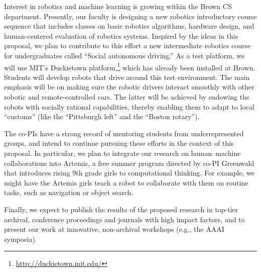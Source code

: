 Interest in robotics and machine learning is growing within the Brown
CS department.  Presently, our faculty is designing a new robotics
introductory course sequence that includes classes on basic robotics
algorithms, hardware design, and human-centered evaluation of robotics
systems.  Inspired by the ideas in this proposal, we plan to
contribute to this effort a new intermediate robotics course for
undergraduates called ``Social autonomous driving.''  As a test
platform, we will use MIT's Duckietown
platform,\footnote{\url{http://duckietown.mit.edu/}} which has already
been installed at Brown.  Students will develop robots that drive
around this test environment.  The main emphasis will be on making
sure the robotic drivers interact smoothly with other robotic and
remote-controlled cars.  The latter will be achieved by endowing the
robots with socially rational capabilities, thereby enabling them to
adapt to local ``customs''
(like the ``Pittsburgh left'' and the ``Boston rotary'').



The co-PIs have a strong record of mentoring students from
underrepresented groups, and intend to continue pursuing these efforts
in the context of this proposal.  In particular, we plan to integrate
our research on human--machine collaborations into Artemis, a free
summer program directed by co-PI Greenwald that introduces rising 9th
grade girls to computational thinking.  For example, we might have the
Artemis girls teach a robot to collaborate with them on routine tasks,
such as navigation or object search.



Finally, we expect to publish the results of the proposed research in
top-tier archival, conference proceedings and journals with high
impact factors, and to present our work at innovative, non-archival
workshops (e.g., the AAAI symposia).

